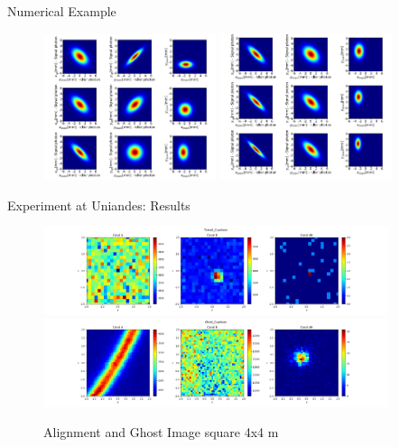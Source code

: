 \documentclass[xcolor=dvipsnames]{beamer}
\begin{document}
\begin{frame}{Numerical Example}

\begin{figure}

{  \includegraphics[width=0.45\textwidth]{pictures/correlaciones.png} }
{  \includegraphics[width=0.45\textwidth]{pictures/correlaciones2.png} }
 \label{n1}
 
\end{figure}
\end{frame}

\begin{frame}{Experiment at Uniandes: Results}

\begin{figure}
 \centering

{  \includegraphics[width=0.9\textwidth]{pictures/Toma5_Cuadraro.png} }
{  \includegraphics[width=0.9\textwidth]{pictures/Ghost_Cuadraro.png} }
\caption{Alignment and Ghost Image square 4x4 \mu m}
 \label{n1}
\end{figure}

\end{frame}
\end{document}
